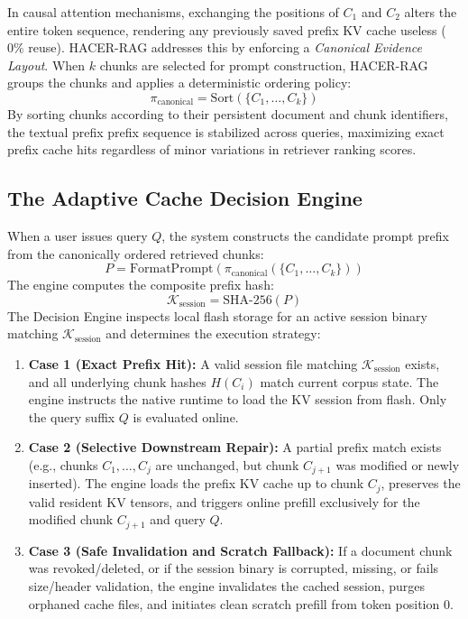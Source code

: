 In causal attention mechanisms, exchanging the positions of $C_1$ and $C_2$ alters the entire token sequence, rendering any previously saved prefix KV cache useless ($0\%$ reuse). HACER-RAG addresses this by enforcing a \emph{Canonical Evidence Layout}. When $k$ chunks are selected for prompt construction, HACER-RAG groups the chunks and applies a deterministic ordering policy:
\begin{equation}
    \pi_{\text{canonical}} = \text{Sort}(\{C_1, \dots, C_k\})
\end{equation}
By sorting chunks according to their persistent document and chunk identifiers, the textual prefix prefix sequence is stabilized across queries, maximizing exact prefix cache hits regardless of minor variations in retriever ranking scores.

\subsection{The Adaptive Cache Decision Engine}
When a user issues query $Q$, the system constructs the candidate prompt prefix from the canonically ordered retrieved chunks:
\begin{equation}
    P = \text{FormatPrompt}(\pi_{\text{canonical}}(\{C_1, \dots, C_k\}))
\end{equation}
The engine computes the composite prefix hash:
\begin{equation}
    \mathcal{K}_{\text{session}} = \text{SHA-256}(P)
\end{equation}
The Decision Engine inspects local flash storage for an active session binary matching $\mathcal{K}_{\text{session}}$ and determines the execution strategy:
\begin{enumerate}
    \item \textbf{Case 1 (Exact Prefix Hit):} A valid session file matching $\mathcal{K}_{\text{session}}$ exists, and all underlying chunk hashes $H(C_i)$ match current corpus state. The engine instructs the native runtime to load the KV session from flash. Only the query suffix $Q$ is evaluated online.
    \item \textbf{Case 2 (Selective Downstream Repair):} A partial prefix match exists (e.g., chunks $C_1, \dots, C_{j}$ are unchanged, but chunk $C_{j+1}$ was modified or newly inserted). The engine loads the prefix KV cache up to chunk $C_j$, preserves the valid resident KV tensors, and triggers online prefill exclusively for the modified chunk $C_{j+1}$ and query $Q$.
    \item \textbf{Case 3 (Safe Invalidation and Scratch Fallback):} If a document chunk was revoked/deleted, or if the session binary is corrupted, missing, or fails size/header validation, the engine invalidates the cached session, purges orphaned cache files, and initiates clean scratch prefill from token position 0.
\end{enumerate}

